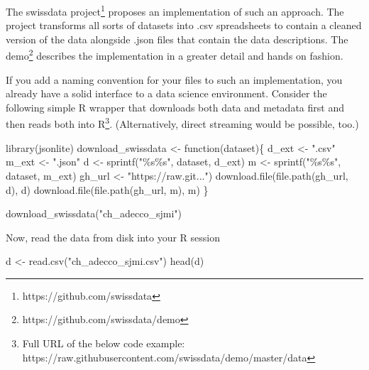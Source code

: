 \documentclass[
  12pt,
  letterpaper,
]{krantz}
\newenvironment{Shaded}{\begin{snugshade}}{\end{snugshade}}
\newcommand{\ControlFlowTok}[1]{\textcolor[rgb]{0.00,0.23,0.31}{#1}}
\newcommand{\ErrorTok}[1]{\textcolor[rgb]{0.68,0.00,0.00}{#1}}
\newcommand{\FunctionTok}[1]{\textcolor[rgb]{0.28,0.35,0.67}{#1}}
\newcommand{\NormalTok}[1]{\textcolor[rgb]{0.00,0.23,0.31}{#1}}
\newcommand{\OtherTok}[1]{\textcolor[rgb]{0.00,0.23,0.31}{#1}}
\newcommand{\StringTok}[1]{\textcolor[rgb]{0.13,0.47,0.30}{#1}}
\begin{document}
The swissdata project\footnote{https://github.com/swissdata} proposes an
implementation of such an approach. The project transforms all sorts of
datasets into .csv spreadsheets to contain a cleaned version of the data
alongside .json files that contain the data descriptions. The
demo\footnote{https://github.com/swissdata/demo} describes the
implementation in a greater detail and hands on fashion.

If you add a naming convention for your files to such an implementation,
you already have a solid interface to a data science environment.
Consider the following simple R wrapper that downloads both data and
metadata first and then reads both into R\footnote{Full URL of the below
  code example:
  https://raw.githubusercontent.com/swissdata/demo/master/data}.
(Alternatively, direct streaming would be possible, too.)

\begin{Shaded}
\begin{Highlighting}[]
\FunctionTok{library}\NormalTok{(jsonlite)}
\NormalTok{download\_swissdata }\OtherTok{\textless{}{-}} \ControlFlowTok{function}\NormalTok{(dataset)\{}
\NormalTok{  d\_ext }\OtherTok{\textless{}{-}} \StringTok{".csv"}  
\NormalTok{  m\_ext }\OtherTok{\textless{}{-}} \StringTok{".json"}
\NormalTok{  d }\OtherTok{\textless{}{-}} \FunctionTok{sprintf}\NormalTok{(}\StringTok{"\%s\%s"}\NormalTok{, dataset, d\_ext)}
\NormalTok{  m }\OtherTok{\textless{}{-}} \FunctionTok{sprintf}\NormalTok{(}\StringTok{"\%s\%s"}\NormalTok{, dataset, m\_ext)}
\NormalTok{  gh\_url }\OtherTok{\textless{}{-}} \StringTok{"https://raw.git..."}\ErrorTok{)}
  \FunctionTok{download.file}\NormalTok{(}\FunctionTok{file.path}\NormalTok{(gh\_url, d), d)}
  \FunctionTok{download.file}\NormalTok{(}\FunctionTok{file.path}\NormalTok{(gh\_url, m), m)}
\NormalTok{\}}


\FunctionTok{download\_swissdata}\NormalTok{(}\StringTok{"ch\_adecco\_sjmi"}\NormalTok{)}
\end{Highlighting}
\end{Shaded}

Now, read the data from disk into your R session

\begin{Shaded}
\begin{Highlighting}[]
\NormalTok{d }\OtherTok{\textless{}{-}} \FunctionTok{read.csv}\NormalTok{(}\StringTok{"ch\_adecco\_sjmi.csv"}\NormalTok{)}
\FunctionTok{head}\NormalTok{(d)}
\end{Highlighting}
\end{Shaded}
\end{document}
